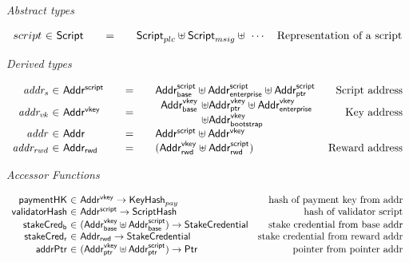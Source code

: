 \documentclass[11pt,a4paper,dvipsnames,twosided]{article}
\newcommand{\Addr}{\type{Addr}}
\newcommand{\AddrVKey}{\type{Addr^{vkey}}}
\newcommand{\StakeObject}{\type{StakeCredential}}
\newcommand{\AddrRWD}{\type{Addr_{rwd}}}
\newcommand{\AddrRWDVKey}{\type{Addr_{rwd}^{vkey}}}
\newcommand{\AddrRWDScr}{\type{Addr_{rwd}^{script}}}
\newcommand{\AddrVKeyB}{\type{Addr^{vkey}_{base}}}
\newcommand{\AddrVKeyP}{\type{Addr^{vkey}_{ptr}}}
\newcommand{\AddrVKeyE}{\type{Addr^{vkey}_{enterprise}}}
\newcommand{\AddrVKeyBS}{\type{Addr^{vkey}_{bootstrap}}}
\newcommand{\AddrScr}{\type{Addr^{script}}}
\newcommand{\AddrScrBase}{\type{Addr_{base}^{script}}}
\newcommand{\AddrScrEnterprise}{\type{Addr_{enterprise}^{script}}}
\newcommand{\AddrScrPtr}{\type{Addr_{ptr}^{script}}}
\newcommand{\HashScr}{\type{ScriptHash}}
\newcommand{\Ptr}{\type{Ptr}}
\newcommand{\Script}{\type{Script}}
\newcommand{\ScriptPlutus}{\Script_{plc}}
\newcommand{\ScriptMSig}{\Script_{msig}}
\newcommand{\KeyHash}{\type{KeyHash}}
\theoremstyle{definition}
\begin{document}
\begin{figure}[hbt]
  \emph{Abstract types}

  \begin{equation*}
    \begin{array}{r@{~\in~}l@{\qquad=\qquad}lr}
      script & \Script & \ScriptPlutus\uniondistinct\ScriptMSig\uniondistinct\,\,\cdots  & \text{Representation of a script}
    \end{array}
  \end{equation*}

  \emph{Derived types}

  \begin{equation*}
    \begin{array}{r@{~\in~}l@{\qquad=\qquad}lr}
      \var{addr_{s}} & \AddrScr & \AddrScrBase \uniondistinct \AddrScrEnterprise
                              \uniondistinct \AddrScrPtr & \text{Script address} \\
      \var{addr_{vk}} & \AddrVKey & \begin{array}{l@{~\uniondistinct}l}
                             \AddrVKeyB & \AddrVKeyP \uniondistinct \AddrVKeyE \\
                                    & \AddrVKeyBS
                           \end{array}
                                & \text{Key address}\\
      \var{addr} & \Addr & \AddrScr \uniondistinct \AddrVKey \\
      \var{addr_{rwd}} & \AddrRWD & (\AddrRWDVKey \uniondistinct \AddrRWDScr)
                                                         & \text{Reward address}
    \end{array}
  \end{equation*}

  \emph{Accessor Functions}

  \begin{equation*}
    \begin{array}{r@{~\in~}lr}
      \fun{paymentHK} & \AddrVKey \to \KeyHash_{pay}
      & \text{hash of payment key from addr}\\
      \fun{validatorHash} & \AddrScr \to \HashScr & \text{hash of validator
                                                    script} \\
      \fun{stakeCred_{b}} & (\AddrVKeyB \uniondistinct \AddrScrBase) \to
                          \StakeObject & \text{stake credential from base
                                      addr}\\
      \fun{stakeCred_{r}} & \AddrRWD \to \StakeObject & \text{stake credential
                                                   from reward addr}\\
      \fun{addrPtr} & (\AddrVKeyP \uniondistinct \AddrScrPtr) \to \Ptr &
                                                                         \text{pointer
                                                                         from
                                                                         pointer addr}
    \end{array}
  \end{equation*}


\end{figure}
\end{document}
